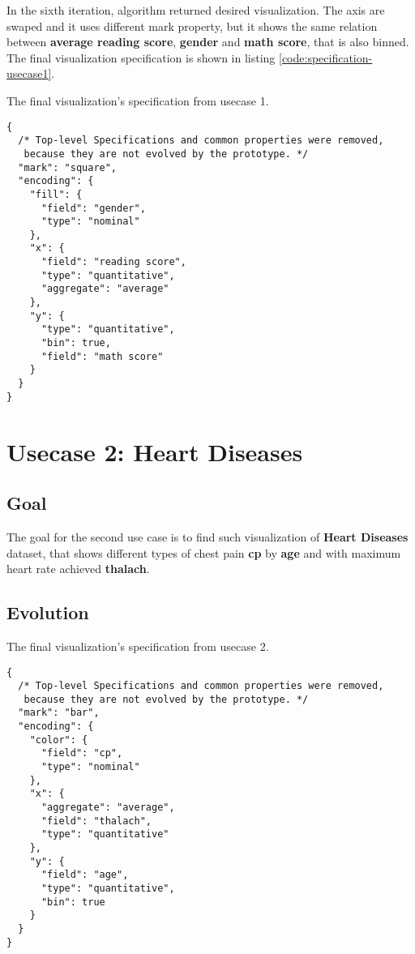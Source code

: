 In the sixth iteration, algorithm returned desired visualization. The axis are swaped and it uses different mark property, but it shows the same relation between \textbf{average reading score}, \textbf{gender} and \textbf{math score}, that is also binned. The final visualization specification is shown in listing \ref{code:specification-usecase1}.


\begin{listing}[htbp]
\caption{\label{code:specification-usecase1}The final visualization's specification from usecase 1.}
\begin{verbatim}
{
  /* Top-level Specifications and common properties were removed,
   because they are not evolved by the prototype. */
  "mark": "square",
  "encoding": {
    "fill": {
      "field": "gender",
      "type": "nominal"
    },
    "x": {
      "field": "reading score",
      "type": "quantitative",
      "aggregate": "average"
    },
    "y": {
      "type": "quantitative",
      "bin": true,
      "field": "math score"
    }
  }
}
\end{verbatim}
\end{listing}

\clearpage

\section{Usecase 2: Heart Diseases}
\subsection{Goal}
The goal for the second use case is to find such visualization of \textbf{Heart Diseases} dataset, that shows different types of chest pain \textbf{cp} by \textbf{age} and with maximum heart rate achieved \textbf{thalach}.
\subsection{Evolution}


\begin{listing}[htbp]
\caption{\label{code:specification-usecase2}The final visualization's specification from usecase 2.}
\begin{verbatim}
{
  /* Top-level Specifications and common properties were removed,
   because they are not evolved by the prototype. */
  "mark": "bar",
  "encoding": {
    "color": {
      "field": "cp",
      "type": "nominal"
    },
    "x": {
      "aggregate": "average",
      "field": "thalach",
      "type": "quantitative"
    },
    "y": {
      "field": "age",
      "type": "quantitative",
      "bin": true
    }
  }
}
\end{verbatim}
\end{listing}
